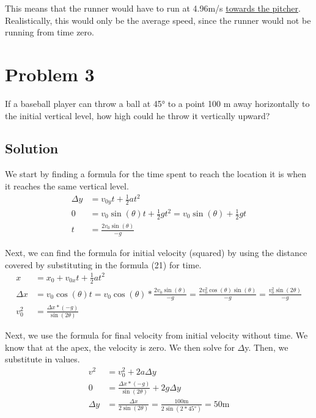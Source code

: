 \documentclass[12pt]{article}
\begin{document}
This means that the runner would have to run at 4.96\unit{\meter/\second} \underline{towards the pitcher}. Realistically, this would only be the average speed, since the runner would not be running from time zero.

\pagebreak
\section*{Problem 3}
If a baseball player can throw a ball at 45\unit{\degree} to a point 100 m away horizontally to the initial
vertical level, how high could he throw it vertically upward?

\subsection*{Solution}
We start by finding a formula for the time spent to reach the location it is when it reaches the same vertical level.
\begin{align}
    \Delta y &= v_{0y}t + \frac{1}{2}at^2\\
    0 &= v_0\sin(\theta)t + \frac{1}{2}gt^2
      = v_0\sin(\theta) + \frac{1}{2}gt\\
    t &= \frac{2v_0\sin(\theta)}{-g}
\end{align}

Next, we can find the formula for initial velocity (squared) by using the distance covered by substituting in the formula (21) for time.
\begin{align}
    x &= x_0 + v_{0x}t + \frac{1}{2}at^2\\
    \Delta x &= v_0\cos(\theta)t = v_0\cos(\theta)*\frac{2v_0\sin(\theta)}{-g} 
        = \frac{2v_0^2\cos(\theta)\sin(\theta)}{-g} 
        = \frac{v_0^2\sin(2\theta)}{-g}\\
    v_0^2 &= \frac{\Delta x * (-g)}{\sin(2\theta)}
\end{align}

Next, we use the formula for final velocity from initial velocity without time. We know that at the apex, the velocity is zero. We then solve for $\Delta$y. Then, we substitute in values.
\begin{align}
    v^2 &= v_0^2 + 2 a \Delta y\\
    0 &= \frac{\Delta x * (-g)}{\sin(2\theta)} + 2 g \Delta y\\
    \Delta y &= \frac{\Delta x}{2\sin(2\theta)} = \frac{100\unit{\meter}}{2\sin(2*45\unit{\degree})} = \boxed{50 \unit{\meter}}
\end{align}
\end{document}
